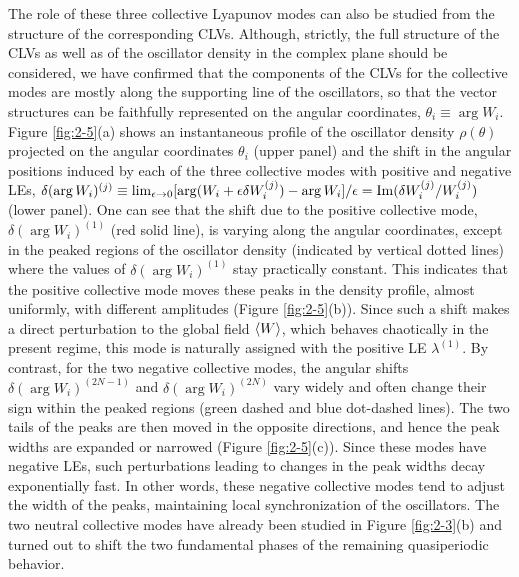 \documentclass[12pt]{iopart}
\begin{document}
The role of these three collective Lyapunov modes can also be studied
 from the structure of the corresponding CLVs.
Although, strictly, the full structure of the CLVs
 as well as of the oscillator density in the complex plane
 should be considered, we have confirmed that
 the components of the CLVs for the collective modes are mostly
 along the supporting line of the oscillators,
 so that the vector structures can be faithfully represented
 on the angular coordinates, $\theta_i \equiv \arg W_i$.
Figure \ref{fig:2-5}(a) shows an instantaneous profile
 of the oscillator density $\rho(\theta)$
 projected on the angular coordinates $\theta_i$ (upper panel)
 and the shift in the angular positions induced
 by each of the three collective modes with positive and negative LEs,
 $\delta(\arg W_i)^{(j)} \equiv \lim_{\epsilon \to 0} [\arg(W_i + \epsilon\delta W_i^{(j)}) - \arg W_i]/\epsilon = \mathrm{Im}(\delta W_i^{(j)}/W_i^{(j)})$ (lower panel).
One can see that the shift due to the positive collective mode,
 $\delta(\arg W_i)^{(1)}$ (red solid line),
 is varying along the angular coordinates,
 except in the peaked regions of the oscillator density
 (indicated by vertical dotted lines)
 where the values of $\delta(\arg W_i)^{(1)}$ stay practically constant.
This indicates that the positive collective mode moves
 these peaks in the density profile, almost uniformly,
 with different amplitudes (Figure \ref{fig:2-5}(b)).
Since such a shift makes a direct perturbation to the global field $\langle W \rangle$,
 which behaves chaotically in the present regime,
 this mode is naturally assigned with the positive LE $\lambda^{(1)}$.
By contrast, for the two negative collective modes,
 the angular shifts $\delta(\arg W_i)^{(2N-1)}$ and $\delta(\arg W_i)^{(2N)}$
 vary widely and often change their sign within the peaked regions
 (green dashed and blue dot-dashed lines).
The two tails of the peaks are then moved in the opposite directions,
 and hence the peak widths are expanded or narrowed (Figure \ref{fig:2-5}(c)).
Since these modes have negative LEs,
 such perturbations leading to changes in the peak widths
 decay exponentially fast.
In other words, these negative collective modes tend to adjust
 the width of the peaks, maintaining local synchronization of the oscillators.
The two neutral collective modes have already been studied
 in Figure \ref{fig:2-3}(b) and turned out to shift
 the two fundamental phases of the remaining quasiperiodic behavior.
\end{document}

